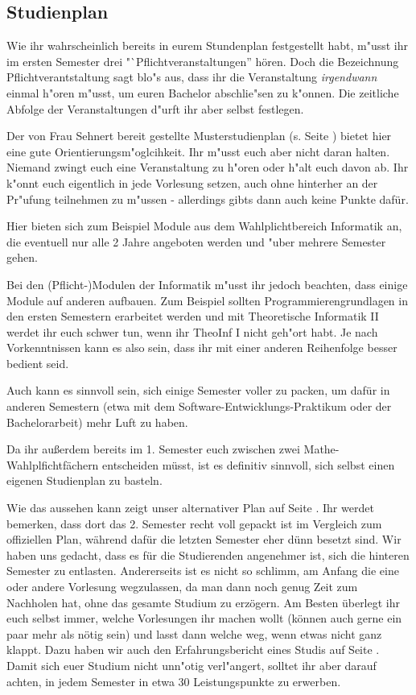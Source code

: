 \subsection{Studienplan}
\label{bach_studienplan}
Wie ihr wahrscheinlich bereits in eurem Stundenplan festgestellt habt,
m"usst ihr im ersten Semester drei "`Pflichtveranstaltungen'' hören.  
Doch die Bezeichnung Pflichtverantstaltung sagt blo"s aus, dass ihr die Veranstaltung \emph{irgendwann} einmal h"oren m"usst, um euren Bachelor abschlie"sen zu k"onnen.
Die zeitliche Abfolge der Veranstaltungen d"urft ihr aber selbst festlegen.

Der von Frau Sehnert bereit gestellte Musterstudienplan (s. Seite \pageref{musterstudienplan}) bietet hier eine gute Orientierungsm"oglcihkeit.
Ihr m"usst euch aber nicht daran halten. Niemand zwingt euch eine Veranstaltung zu h"oren oder h"alt euch davon ab.
Ihr k"onnt euch eigentlich in jede Vorlesung setzen, auch ohne
hinterher an der Pr"ufung teilnehmen zu m"ussen - allerdings gibts
dann auch keine Punkte dafür. 

Hier bieten sich zum Beispiel Module aus dem Wahlplichtbereich Informatik an, die eventuell nur alle 2 Jahre angeboten werden und "uber mehrere Semester gehen.

Bei den (Pflicht-)Modulen der Informatik m"usst ihr jedoch beachten, dass einige Module auf anderen aufbauen.
Zum Beispiel sollten Programmierengrundlagen in den ersten  Semestern
erarbeitet werden und mit Theoretische Informatik II werdet ihr euch
schwer tun, wenn ihr TheoInf I nicht geh"ort habt.
Je nach Vorkenntnissen kann es also sein,
dass ihr mit einer anderen Reihenfolge besser bedient seid. 

Auch kann
es sinnvoll sein, sich einige Semester voller zu packen, um dafür in
anderen Semestern (etwa mit dem Software-Entwicklungs-Praktikum oder
der Bachelorarbeit) mehr Luft zu haben. 

Da ihr außerdem bereits im
1. Semester euch zwischen zwei Mathe-Wahlplfichtfächern entscheiden
müsst, ist es definitiv sinnvoll, sich selbst einen eigenen
Studienplan zu basteln. 

Wie das aussehen kann zeigt unser alternativer
Plan auf Seite \pageref{studienplan_neu}. Ihr werdet bemerken, dass
dort das 2. Semester recht voll gepackt ist im Vergleich zum
offiziellen Plan, während dafür die letzten Semester eher dünn besetzt
sind. Wir haben uns gedacht, dass es für die Studierenden angenehmer
ist, sich die hinteren Semester zu entlasten. Andererseits ist es
nicht so schlimm, am Anfang die eine oder andere Vorlesung
wegzulassen, da man dann noch genug Zeit zum Nachholen hat, ohne das
gesamte Studium zu erzögern. Am Besten überlegt ihr euch selbst immer,
welche Vorlesungen ihr machen wollt (können auch gerne ein paar mehr
als nötig sein) und lasst dann welche weg, wenn etwas nicht ganz
klappt. Dazu haben wir auch den Erfahrungsbericht eines Studis auf
Seite \pageref{studienplan_bericht}. 
\\
Damit sich euer Studium nicht unn"otig verl"angert, solltet ihr aber darauf achten, in jedem Semester in etwa 30 Leistungspunkte zu erwerben. 


